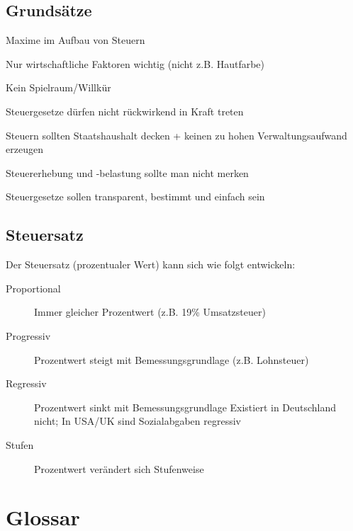\documentclass{beamer}
\newcommand{\n}{\hfill\\\vspace{0.25cm}}
\begin{document}
		\subsection{Grundsätze}
	
			\begin{frame}{Maxime im Aufbau von Steuern}
				\begin{description}[labelwidth=0cm]
					\item[Gerechtigkeit] Nur wirtschaftliche Faktoren wichtig (nicht z.B. Hautfarbe)
					\item[Gleichmäßigkeit] Kein Spielraum/Willkür
					\item[Rückwirkungsverbot] Steuergesetze dürfen nicht rückwirkend in Kraft treten
					\item[Ergiebigkeit] Steuern sollten Staatshaushalt decken + keinen zu hohen Verwaltungsaufwand erzeugen
					\item[Unmerklichkeit] Steuererhebung und -belastung sollte man nicht merken
					\item[Praktikabilität] Steuergesetze sollen transparent, bestimmt und einfach sein
				\end{description}
			\end{frame}
	
	\subsection{Steuersatz}
	
		\begin{frame}
			Der Steuersatz (prozentualer Wert) kann sich wie folgt entwickeln:\n
			\begin{description}
				\item[Proportional] Immer gleicher Prozentwert (z.B. 19\% Umsatzsteuer)
				\item[Progressiv] Prozentwert steigt mit Bemessungsgrundlage (z.B. Lohnsteuer)
				\item[Regressiv] Prozentwert sinkt mit Bemessungsgrundlage \vspace{0.1cm}\newline
				{\tiny Existiert in Deutschland nicht; In USA/UK sind Sozialabgaben regressiv\\}
				\item[Stufen] Prozentwert verändert sich Stufenweise
			\end{description}
		\end{frame}
	
	\section{Glossar}
	
\end{document}

